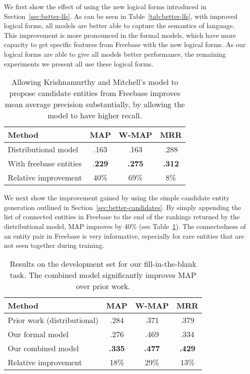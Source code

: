 \documentclass[11pt]{article}
\newcommand{\secref}[1]{Section~\ref{sec:#1}}
\newcommand{\tabref}[1]{Table~\ref{tab:#1}}
\begin{document}
We first show the effect of using the new logical forms introduced in
\secref{better-lfs}.  As can be seen in \tabref{better-lfs}, with improved
logical forms, all models are better able to capture the semantics of language.
This improvement is more pronounced in the formal models, which have more
capacity to get specific features from Freebase with the new logical forms.  As
our logical forms are able to give all models better performance, the remaining
experiments we present all use these logical forms.

\begin{table}
  \centering
  {\small
    \begin{tabular}{lccc}
      \toprule
      Method & MAP & W-MAP & MRR \\
      \midrule
      Distributional model & .163 & .163 & .288 \\
      \midrule
      With freebase entities & .\textbf{229} & \textbf{.275} & \textbf{.312} \\
      \midrule
      \midrule
      Relative improvement & 40\% & 69\% & 8\% \\
      \bottomrule
    \end{tabular}
  }
  \caption{Allowing Krishnamurthy and Mitchell's model to propose candidate
  entities from Freebase improves mean average precision substantially, by
  allowing the model to have higher recall.}
  \label{tab:better-candidates}
\end{table}

We next show the improvement gained by using the simple candidate entity
generation outlined in \secref{better-candidates}.  By simply appending the
list of connected entities in Freebase to the end of the rankings returned by
the distributional model, MAP improves by 40\% (see
\tabref{better-candidates}).  The connectedness of an entity pair in Freebase
is very informative, especially for rare entities that are not seen together
during training.

\begin{table}
  \centering
  {\small
    \begin{tabular}{lccc}
      \toprule
      Method & MAP & W-MAP & MRR \\
      \midrule
      Prior work (distributional) & .284 & .371 & .379 \\
      \midrule
      Our formal model & .276 & .469 & .334 \\
      \midrule
      Our combined model & \textbf{.335} & \textbf{.477} & \textbf{.429} \\
      \midrule
      \midrule
      Relative improvement & 18\% & 29\% & 13\% \\
      \bottomrule
    \end{tabular}
  }
  \caption{Results on the development set for our fill-in-the-blank task.  The
  combined model significantly improves MAP over prior work.}
  \label{tab:dev-results}
\end{table}
\end{document}

